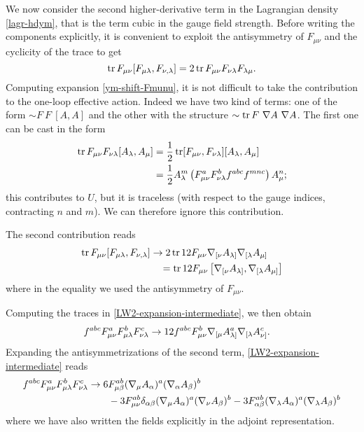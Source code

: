 We now consider the second higher-derivative term in the Lagrangian density \eqref{lagr-hdym}, that is the term cubic in the gauge field strength.
Before writing the components explicitly, it is convenient to exploit the antisymmetry of $F_{\mu\nu}$  and the cyclicity of the trace to get
\begin{equation}
\operatorname{tr}  F_{\mu\nu} [ F_{\mu\lambda} , F_{\nu,\lambda} ]
 = 
2 \operatorname{tr}  F_{\mu\nu} F_{\nu\lambda} F_{\lambda \mu} .
\end{equation}
Computing expansion \eqref{ym-shift-Fmunu}, it is not difficult to take the contribution to the one-loop effective action. Indeed we have two kind of terms: one of the form $\sim F\ F\ [ A,  A] $ and the other with the structure $\sim \tr F\ \covD A\ \covD A$. The first one can be cast in the form
\begin{equation}
\begin{split}
\operatorname{tr}  F_{ \mu \nu } F_{ \nu \lambda } [ A_\lambda , A_\mu  ]
&	=
\frac{1}{2}\operatorname{tr} [ F_{ \mu \nu } ,  F_{ \nu \lambda } ] [ A_\lambda , A_\mu  ]
\\
&	=
\frac{1}{2}
A^m_\lambda
\left(
F^a_{ \mu \nu }  F^b_{ \nu \lambda }  f^{abc} f^{mnc}
\right)
A^n_\mu ;
\end{split}
\end{equation}
this contributes to $U$, but it is traceless (with respect to the gauge indices, \ie contracting $n$ and $m$). We can therefore ignore this contribution.

The second contribution reads
\begin{equation}\label{LW2-expansion-intermediate}
\begin{split}
\operatorname{tr}  F_{\mu\nu} [ F_{\mu\lambda} , F_{\nu,\lambda} ]
& \rightarrow
2  \operatorname{tr} 12  F_{\mu\nu} { \mathcal{\nabla} }_{[\nu} A_{\lambda]} { \mathcal{\nabla} }_{[\lambda} A_{\mu]}
\\
&  \quad =
\operatorname{tr} 12  F_{\mu\nu} 
\left[ 
	{ \mathcal{\nabla} }_{[\nu} A_{\lambda]} , { \mathcal{\nabla} }_{[\lambda} A_{\mu]}
\right]
\end{split}
\end{equation}
where in the equality we used the antisymmetry of $F_{\mu\nu}.$

Computing the traces in \eqref{LW2-expansion-intermediate}, we then obtain
\begin{align}
f^{abc} F_{\mu\nu}^a F_{\mu\lambda}^b F_{\nu\lambda}^c
	& \rightarrow 
12 f^{abc} F^b_{\mu\nu} { \mathcal{\nabla} }_{[\mu} A^a_{\lambda]} { \mathcal{\nabla} }_{[\lambda} A^c_{\nu]} .
\end{align}
Expanding the antisymmetrizations of the second term, \eqref{LW2-expansion-intermediate} reads
\begin{align*}
\begin{split}
f^{abc} F_{\mu\nu}^a F_{\mu\lambda}^b F_{\nu\lambda}^c
 \rightarrow 
 6 & F^{ a b }_{\mu \beta}  ( { \mathcal{\nabla} }_{\mu} A_{\alpha} )^a ( { \mathcal{\nabla} }_{\alpha} A_{\beta} )^b
 \\
 & 
 - 3 F^{ a b }_{\mu\nu} \delta_{ \alpha \beta } ( { \mathcal{\nabla} }_{\mu} A_{\alpha} )^a ( { \mathcal{\nabla} }_{\nu} A_{\beta} )^b- 3 F^{ a b }_{\alpha \beta} ( { \mathcal{\nabla} }_{\lambda} A_{\alpha} )^a ( { \mathcal{\nabla} }_{\lambda} A_{\beta} )^b
\end{split}
\end{align*}
where we have also written the fields explicitly in the adjoint representation.

